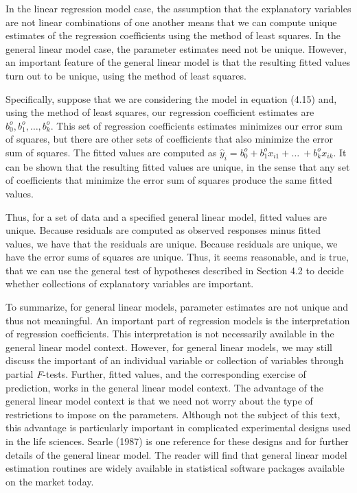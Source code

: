In the linear regression model case, the assumption that the
explanatory variables are not linear combinations of one another
means that we can compute unique estimates of the regression
coefficients using the method of least squares. In the general
linear model case, the parameter estimates need not be unique.
However, an important feature of the general linear model is that
the resulting fitted values turn out to be unique, using the method
of least squares.

Specifically, suppose that we are considering the model in equation
(4.15) and, using the method of least squares, our regression
coefficient estimates are $b_{0}^{o},b_{1}^{o},\ldots ,b_{k}^{o}$.
This set of regression coefficients estimates minimizes our error
sum of squares, but there are other sets of coefficients that also
minimize the error sum of squares. The fitted values are computed as
$\hat{y}_{i}=b_{0}^{o}+b_{1}^{o}x_{i1}+\ldots \ +b_{k}^{o}x_{ik}$.
It can be shown that the resulting fitted values are unique, in the
sense that any set of coefficients that minimize the error sum of
squares produce the same fitted values.

Thus, for a set of data and a specified general linear model, fitted
values are unique. Because residuals are computed as observed
responses minus fitted values, we have that the residuals are
unique. Because residuals are unique, we have the error sums of
squares are unique. Thus, it seems reasonable, and is true, that we
can use the general test of hypotheses described in Section 4.2 to
decide whether collections of explanatory variables are important.

To summarize, for general linear models, parameter estimates are not
unique and thus not meaningful. An important part of regression
models is the interpretation of regression coefficients. This
interpretation is not necessarily available in the general linear
model context. However, for general linear models, we may still
discuss the important of an individual variable or collection of
variables through partial \textit{F}-tests. Further, fitted values,
and the corresponding exercise of prediction, works in the general
linear model context. The advantage of the general linear model
context is that we need not worry about the type of restrictions to
impose on the parameters. Although not the subject of this text,
this advantage is particularly important in complicated experimental
designs used in the life sciences. Searle (1987) is one reference
for these designs and for further details of the general linear
model. The reader will find that general linear model estimation
routines are widely available in statistical software packages
available on the market today.


